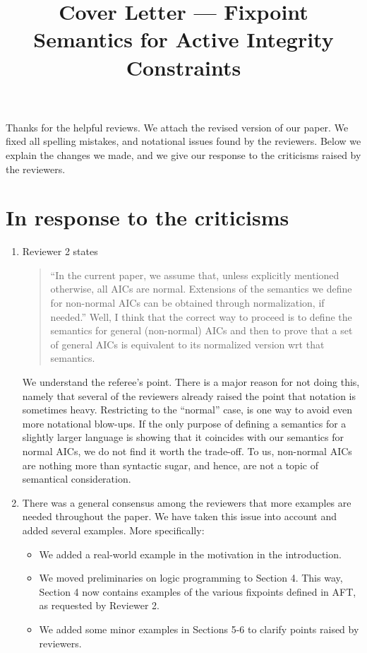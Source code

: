 \documentclass{article}
\title{Cover Letter --- Fixpoint Semantics for Active Integrity Constraints}
\begin{document}
\maketitle
Thanks for the helpful reviews. We attach the revised version of our paper. 
 We fixed all spelling mistakes, and notational issues found by the reviewers.
Below we explain the changes we made, and we give our response to the criticisms raised by the reviewers. 


\section{In response to the criticisms}
	\begin{enumerate}
	 \item Reviewer 2 states
	 \begin{quote}
	  ``In the current paper, we assume that, unless explicitly mentioned otherwise, all AICs are normal.
Extensions of the semantics we deﬁne for non-normal AICs can be obtained through normalization, if needed.''
Well, I think that the correct way to proceed is to define the semantics for general (non-normal) AICs and
then to prove that a set of general AICs is equivalent to its normalized version wrt that semantics.
	 \end{quote}
         We understand the referee's point. There is a major reason for not doing this, namely that several of the reviewers already raised the point that notation is sometimes heavy. Restricting to the ``normal'' case, is one way to avoid even more notational blow-ups. If the only purpose of defining a semantics for a slightly larger language is showing that it coincides with our semantics for normal AICs, we do not find it worth the trade-off. To us, non-normal AICs are nothing more than syntactic sugar, and hence, are not a topic of semantical consideration. 


	 \item There was a general consensus among the reviewers that more examples are needed throughout the paper. We have taken this issue into account and added several examples. More specifically:
	  \begin{itemize}
	  \item We added a real-world example in the motivation in the introduction.
	  \item We moved preliminaries on logic programming to Section 4. This way, Section 4 now contains examples of the various fixpoints defined in AFT, as requested by Reviewer 2. 
	  \item We added some minor examples in Sections 5-6 to clarify points raised by reviewers. 
	  \end{itemize}
	  

\end{enumerate}
\end{document}

